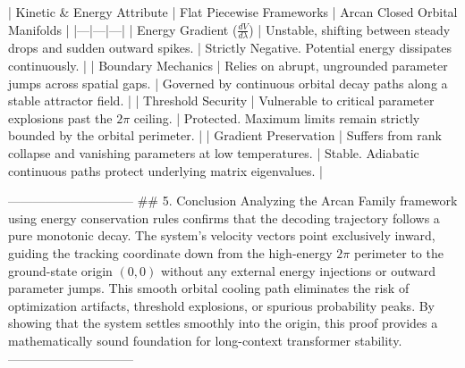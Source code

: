 | Kinetic & Energy Attribute | Flat Piecewise Frameworks | Arcan Closed Orbital Manifolds |
|---|---|---|
| Energy Gradient ($\frac{dV}{d\lambda}$) | Unstable, shifting between steady drops and sudden outward spikes. | Strictly Negative. Potential energy dissipates continuously. |
| Boundary Mechanics | Relies on abrupt, ungrounded parameter jumps across spatial gaps. | Governed by continuous orbital decay paths along a stable attractor field. |
| Threshold Security | Vulnerable to critical parameter explosions past the $2\pi$ ceiling. | Protected. Maximum limits remain strictly bounded by the orbital perimeter. |
| Gradient Preservation | Suffers from rank collapse and vanishing parameters at low temperatures. | Stable. Adiabatic continuous paths protect underlying matrix eigenvalues. |

------------------------------
## 5. Conclusion
Analyzing the Arcan Family framework using energy conservation rules confirms that the decoding trajectory follows a pure monotonic decay. The system's velocity vectors point exclusively inward, guiding the tracking coordinate down from the high-energy $2\pi$ perimeter to the ground-state origin $(0,0)$ without any external energy injections or outward parameter jumps. This smooth orbital cooling path eliminates the risk of optimization artifacts, threshold explosions, or spurious probability peaks. By showing that the system settles smoothly into the origin, this proof provides a mathematically sound foundation for long-context transformer stability.
------------------------------
